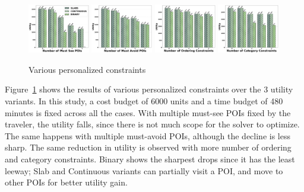 \begin{figure}[t]
\centering
\includegraphics[width=0.24\textwidth]{plots/mustsee.png}
\includegraphics[width=0.24\textwidth]{plots/mustavoid.png}
\includegraphics[width=0.24\textwidth]{plots/ordering.png}
\includegraphics[width=0.24\textwidth]{plots/category.png}
\caption{Various personalized constraints}
\label{fig:personalizedconstraints}
\end{figure}

Figure~\ref{fig:personalizedconstraints} shows the results of various personalized constraints over the 3 utility variants.
In this study, a cost budget of 6000 units and a time budget of 480 minutes is fixed across all the cases.
With multiple must-see POIs fixed by the traveler, the utility falls, since there is not much scope for the solver to optimize. The same happens with multiple must-avoid POIs, although the decline is less sharp.
The same reduction in utility is observed with more number of ordering and category constraints.
Binary shows the sharpest drops since it has the least leeway; Slab and Continuous variants can partially visit a POI, and move to other POIs for better utility gain.

